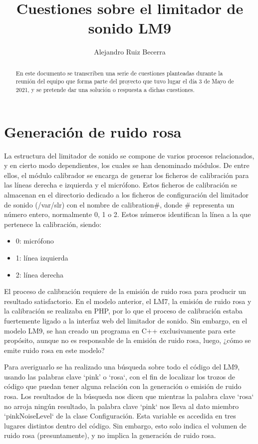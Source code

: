 \documentclass[]{article}
\title{Cuestiones sobre el limitador de sonido LM9}
\author{Alejandro Ruiz Becerra}
\begin{document}

\maketitle

\begin{abstract}
	En este documento se transcriben una serie de cuestiones planteadas durante la reunión del equipo que forma parte del proyecto que tuvo lugar el día 3 de Mayo de 2021, y se pretende dar una solución o respuesta a dichas cuestiones.
\end{abstract}

\section{Generación de ruido rosa}
La estructura del limitador de sonido se compone de varios procesos relacionados, y en cierto modo dependientes, los cuales se han denominado módulos. De entre ellos, el módulo calibrador se encarga de generar los ficheros de calibración para las líneas derecha e izquierda y el micrófono. Estos ficheros de calibración se almacenan en el directorio dedicado a los ficheros de configuración del limitador de sonido (/var/slr) con el nombre de calibration\#, donde \# representa un número entero, normalmente 0, 1 o 2. Estos números identifican la línea a la que pertenece la calibración, siendo:

\begin{itemize}
	\item 0: micrófono
	\item 1: línea izquierda
	\item 2: línea derecha
\end{itemize}

El proceso de calibración requiere de la emisión de ruido rosa para producir un resultado satisfactorio. En el modelo anterior, el LM7, la emisión de ruido rosa y la calibración se realizaba en PHP, por lo que el proceso de calibración estaba fuertemente ligado a la interfaz web del limitador de sonido. Sin embargo, en el modelo LM9, se han creado un programa en C++ exclusivamente para este propósito, aunque no es responsable de la emisión de ruido rosa, luego, ¿cómo se emite ruido rosa en este modelo?

Para averiguarlo se ha realizado una búsqueda sobre todo el código del LM9, usando las palabras clave `pink' o `rosa`, con el fin de localizar los trozos de código que puedan tener alguna relación con la generación o emisión de ruido rosa. Los resultados de la búsqueda nos dicen que mientras la palabra clave `rosa` no arroja ningún resultado, la palabra clave `pink` nos lleva al dato miembro `pinkNoiseLevel` de la clase Configuración. Esta variable es accedida en tres lugares distintos dentro del código. Sin embargo, esto solo indica el volumen de ruido rosa (presuntamente), y no implica la generación de ruido rosa.
\end{document}
